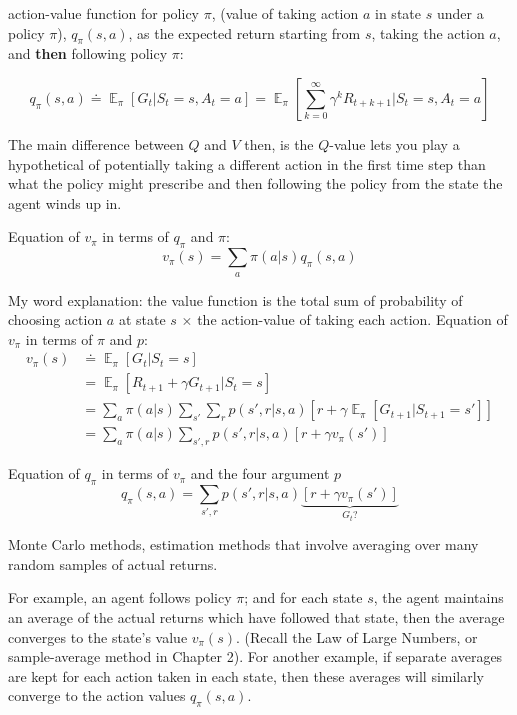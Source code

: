 \documentclass[lang=en,mode=geye,device=normal,color=blue,14pt]{elegantnote}
\DeclareMathOperator*{\E}{\mathbb{E}}
\DeclareMathOperator*{\1}{\mathbbm{1}}
\begin{document}
\begin{definition}
action-value function for policy $\pi$, (value of taking action $a$ in state $s$ under a policy $\pi$), $q_\pi(s,a)$, as the expected return starting from $s$, taking the action $a$, and \textbf{then} following policy $\pi$:

$$ q_\pi(s,a) \doteq \E_\pi [G_t | S_t = s, A_t = a] = \E_\pi [\sum_{k=0}^{\infty} \gamma^k R_{t+k+1} | S_t = s, A_t = a] $$
\end{definition}

The main difference between $Q$ and $V$ then, is the $Q$-value lets you play a hypothetical of potentially taking a different action in the first time step than what the policy might prescribe and then following the policy from the state the agent winds up in.
\newline

Equation of $v_\pi$ in terms of $q_\pi$ and $\pi$:
$$ v_\pi(s) = \sum_a \pi(a|s)q_\pi(s,a) $$

My word explanation: the value function is the total sum of probability of choosing action $a$ at state $s$ $\times$ the action-value of taking each action.
\newline
Equation of $v_\pi$ in terms of $\pi$ and $p$:
\begin{align*}
v_\pi(s) & \doteq \E_\pi[G_t | S_t = s]\\
& = \E_\pi[R_{t+1} + \gamma G_{t+1} | S_t = s]\\
& = \sum_a \pi(a|s) \sum_{s'}\sum_r p(s',r|s,a) [r+ \gamma \E_\pi[G_{t+1} | S_{t+1}=s']]\\
& = \sum_a \pi(a|s) \sum_{s',r} p(s',r|s,a) [r+ \gamma v_\pi(s')]
\end{align*}

Equation of $q_\pi$ in terms of $v_\pi$ and the four argument $p$
$$ q_\pi(s,a) = \sum_{s', r} p(s',r|s,a) \underbrace{ [r+\gamma v_\pi(s')] }_{G_t?} $$

\begin{definition}
Monte Carlo methods, estimation methods that involve averaging over many random samples of actual returns.
\end{definition}

For example, an agent follows policy $\pi$; and for each state $s$, the agent maintains an average of the actual returns which have followed that state, then the average converges to the state's value $v_\pi(s)$. (Recall the Law of Large Numbers, or sample-average method in Chapter 2).
For another example, if separate averages are kept for each action taken in each state, then these averages will similarly converge to the action values $q_\pi(s,a)$.
\end{document}
